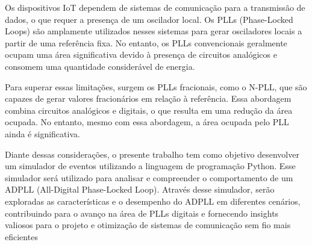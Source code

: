 Os dispositivos IoT dependem de sistemas de comunicação para a transmissão de dados, o que requer a presença de um oscilador local. Os PLLs (Phase-Locked Loops) são amplamente utilizados nesses sistemas para gerar osciladores locais a partir de uma referência fixa. No entanto, os PLLs convencionais geralmente ocupam uma área significativa devido à presença de circuitos analógicos e consomem uma quantidade considerável de energia.

Para superar essas limitações, surgem os PLLs fracionais, como o N-PLL, que são capazes de gerar valores fracionários em relação à referência. Essa abordagem combina circuitos analógicos e digitais, o que resulta em uma redução da área ocupada. No entanto, mesmo com essa abordagem, a área ocupada pelo PLL ainda é significativa.

Diante dessas considerações, o presente trabalho tem como objetivo desenvolver um simulador de eventos utilizando a linguagem de programação Python. Esse simulador será utilizado para analisar e compreender o comportamento de um ADPLL (All-Digital Phase-Locked Loop). Através desse simulador, serão exploradas as características e o desempenho do ADPLL em diferentes cenários, contribuindo para o avanço na área de PLLs digitais e fornecendo insights valiosos para o projeto e otimização de sistemas de comunicação sem fio mais eficientes

